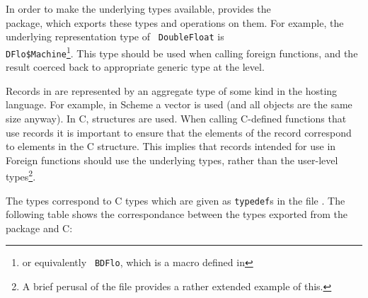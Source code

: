 In order to make the underlying types available, \asharp{} provides
the \\  package, which exports these types and operations
on them. For example, the underlying representation type of {\tt
DoubleFloat} is \\ {\tt DFlo\$Machine}\footnote{or equivalently {\tt
BDFlo}, which is a macro defined in }. This type
should be used when calling foreign functions, and the result coerced
back to appropriate generic type at the \asharp{} level.

Records in \asharp{} are represented by an aggregate type of some kind
in the hosting language. For example, in Scheme a vector is used (and
all objects are the same size anyway). In C, structures are used. When
calling C-defined functions that use records it is important to ensure
that the elements of the \asharp{} record correspond to elements in the
C structure. This implies that records intended for use in Foreign
functions should use the underlying types, rather than the user-level
types\footnote{A brief perusal of the file
 provides a rather extended example
of this.}.

The \asharp{} types correspond to C types which are
given as {\tt typedef}s
in the file .  
The following table shows the correspondance between the types
exported from the \asharp{} package  and C:

